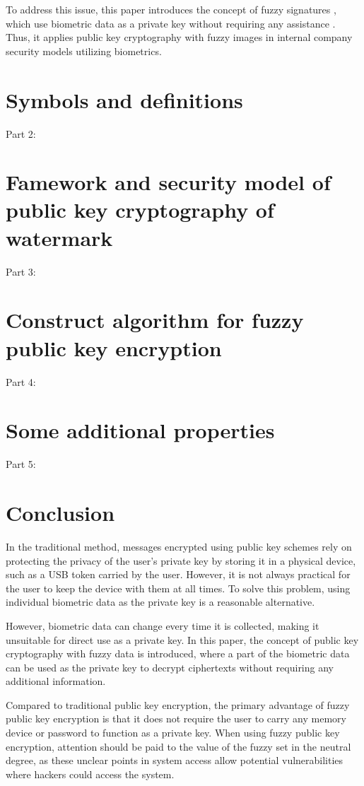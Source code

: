 \documentclass[graybox]{svmult}
\begin{document}
To address this issue, this paper introduces the concept of fuzzy signatures \cite{Takahashi2015}, which use biometric data as a private key without requiring any assistance \cite{Dodis2008}. Thus, it applies public key cryptography with fuzzy images \cite{Son2016} in internal company security models utilizing biometrics.

\section{Symbols and definitions}
Part 2:

\section{Famework and security model of public key cryptography of watermark}
Part 3:

\section{Construct algorithm for fuzzy public key encryption}
Part 4:

\section{Some additional properties}
Part 5:

\section{Conclusion}
In the traditional method, messages encrypted using public key schemes rely on protecting the privacy of the user's private key by storing it in a physical device, such as a USB token carried by the user. However, it is not always practical for the user to keep the device with them at all times. To solve this problem, using individual biometric data as the private key is a reasonable alternative. 

However, biometric data can change every time it is collected, making it unsuitable for direct use as a private key. In this paper, the concept of public key cryptography with fuzzy data is introduced, where a part of the biometric data can be used as the private key to decrypt ciphertexts without requiring any additional information. 

Compared to traditional public key encryption, the primary advantage of fuzzy public key encryption is that it does not require the user to carry any memory device or password to function as a private key. When using fuzzy public key encryption, attention should be paid to the value of the fuzzy set in the neutral degree, as these unclear points in system access allow potential vulnerabilities where hackers could access the system.
\end{document}
